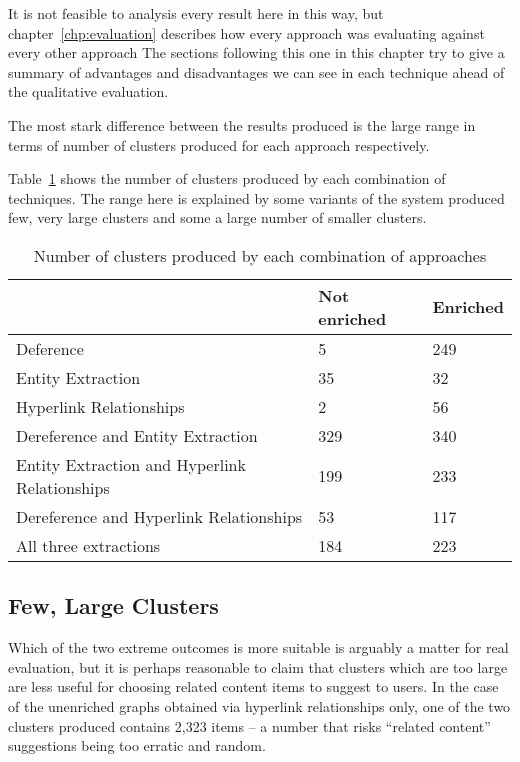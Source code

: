 It is not feasible to analysis every result here in this way, but
chapter~\ref{chp:evaluation} describes how every approach was
evaluating against every other approach The sections following
this one in this chapter try to give a summary of advantages and
disadvantages we can see in each technique ahead of the
qualitative evaluation.

The most stark difference between the results produced is the large
range in terms of number of clusters produced for each approach
respectively.

Table~\ref{tbl:cluster-counts} shows the number of clusters produced
by each combination of techniques. The range here is explained by
some variants of the system produced few, very large clusters and
some a large number of smaller clusters.

\begin{table}[h]
  \centering
  \begin{tabular}{|l|ll|}
    \hline
     & Not enriched & Enriched \\
    \hline
    Deference                                     & 5            & 249      \\
    Entity Extraction                             & 35           & 32       \\
    Hyperlink Relationships                       & 2            & 56       \\
    Dereference and Entity Extraction             & 329          & 340      \\
    Entity Extraction and Hyperlink Relationships & 199          & 233      \\
    Dereference and Hyperlink Relationships       & 53           & 117      \\
    All three extractions                         & 184          & 223     \\
    \hline
  \end{tabular}
  \caption{Number of clusters produced by each combination of approaches}
  \label{tbl:cluster-counts}
\end{table}

\subsection{Few, Large Clusters}
\label{sec:few-large}

Which of the two extreme outcomes is more suitable is arguably a
matter for real evaluation, but it is perhaps reasonable to claim that
clusters which are too large are less useful for choosing related
content items to suggest to users. In the case of the unenriched graphs
obtained via hyperlink relationships only, one of the two clusters
produced contains 2,323 items -- a number that risks
``related content'' suggestions being too erratic and random.

